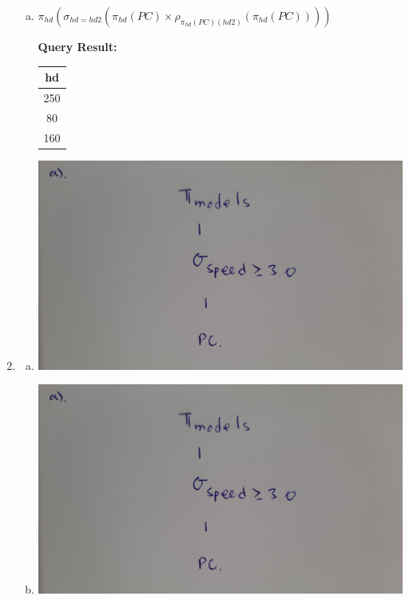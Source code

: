 \documentclass[12pt]{article}
\begin{document}
\begin{enumerate}
\begin{enumerate}[a)]
        \item $\pi_{hd}(\sigma_{hd = hd2}(\pi_{hd}(PC) \times \rho_{\pi_{hd}(PC)(hd2)}(\pi_{hd}(PC))))$

        \bigskip

        \textbf{Query Result:}

        \bigskip

        \begin{tabular}{|c|}
            \hline
            hd\\
            \hline
            250\\
            \hline
            80\\
            \hline
            160\\
            \hline
        \end{tabular}
    \end{enumerate}

    \item

    \begin{enumerate}[a)]
        \item

        \begin{center}
        \includegraphics[width=\linewidth]{images/worksheet_2_solution_11.jpg}
        \end{center}

        \item

        \begin{center}
        \includegraphics[width=\linewidth]{images/worksheet_2_solution_11.jpg}
        \end{center}
    \end{enumerate}


\end{enumerate}
\end{document}
